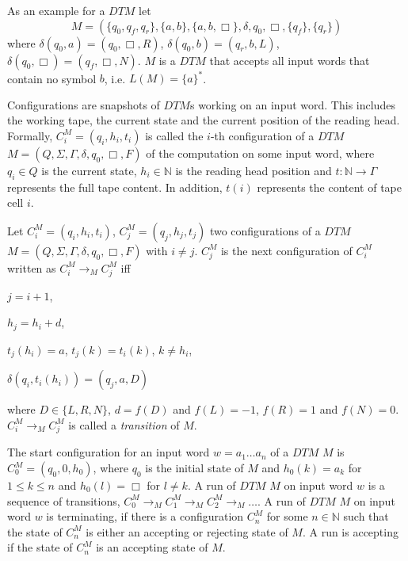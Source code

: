 \begin{example}
    \label{example:dtm}
    As an example for a $\mathit{DTM}$ let
    \[M = (\{q_0, q_f, q_r\}, \{a, b\}, \{a, b, \Box\}, \delta, q_0, \Box, \{q_f\}, \{q_r\})\]
    where $\delta(q_0, a)= (q_0, \Box, R)$, $\delta(q_0, b) = (q_r, b, L)$, $\delta(q_0, \Box) = (q_f, \Box, N)$.
    $M$ is a $\mathit{DTM}$ that accepts all input words that contain no symbol $b$, i.e. $L(M) = \{a\}^*$.
\end{example}

Configurations are snapshots of $\mathit{DTM}$s working on an input word. This includes the working tape, the current
state and the current position of the reading head. Formally, $C_i^M = (q_i, h_i, t_i)$ is called the $i$-th
configuration of a $\mathit{DTM}$ $M = (Q, \Sigma, \Gamma, \delta, q_0, \Box, F)$ of the computation on some input
word, where $q_i \in Q$ is the current state, $h_i \in \mathbb{N}$ is the reading head position and $t: \mathbb{N}
\rightarrow \Gamma$ represents the full tape content. In addition, $t(i)$ represents the content of tape cell $i$.

\begin{definition}
    Let $C_i^M = (q_i, h_i, t_i)$, $C_j^M = (q_j, h_j, t_j)$ two configurations of a
    $\mathit{DTM}$ $M = (Q, \Sigma, \Gamma, \delta, q_0, \Box, F)$ with $i \neq j$. $C_j^M$ is the next configuration
    of $C_i^M$ written as $C_i^M \rightarrow_M C_j^M$ iff
    \begin{compactitem}
        \item $j = i + 1$,

        \item $h_j = h_i + d$,

        \item $t_j(h_i) = a$, $t_j(k) = t_i(k)$, $k \neq h_i$,

        \item $\delta(q_i, t_i(h_i)) = (q_j, a, D)$
    \end{compactitem}
    where $D \in \{L, R, N\}$, $d = f(D)$ and $f(L) = -1$, $f(R) = 1$ and $f(N) = 0$. $C_i^M \rightarrow_M C_j^M$ is
    called a \emph{transition} of $M$.
\end{definition}

The start configuration for an input word $w = a_1\dots a_n$ of a $\mathit{DTM}$ $M$ is $C_0^M = (q_0, 0, h_{0})$,
where $q_0$ is the initial state of $M$ and $h_0(k) = a_k$ for $1 \leq k \leq n$ and $h_0(l) = \Box$ for $l \neq k$. A
run of $\mathit{DTM}$ $M$ on input word $w$ is a sequence of transitions, $C_0^M \rightarrow_M C_1^M \rightarrow_M
C_2^M \rightarrow_M \dots$. A run of $\mathit{DTM}$ $M$ on input word $w$ is terminating, if there is a
configuration $C_n^M$ for some $n \in \mathbb{N}$ such that the state of $C_n^M$ is either an accepting or rejecting
state of $M$. A run is accepting if the state of $C_n^M$ is an accepting state of $M$.

